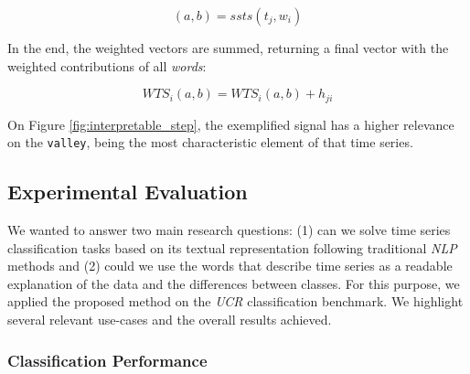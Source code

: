 {\begin{equation}
(a,b) = ssts(t_j, w_i)
\end{equation}

In the end, the  weighted vectors are summed, returning a final vector with the weighted contributions of all \textit{words}:

\begin{equation}
WTS_i(a, b) = WTS_i(a, b) + h_{ji}
\end{equation}

On Figure \ref{fig:interpretable_step}, the exemplified signal has a higher relevance on the \texttt{valley}, being the most characteristic element of that time series.


\subsection{Experimental Evaluation}

We wanted to answer two main research questions: (1) can we solve time series classification tasks based on its textual representation following traditional \textit{NLP} methods and (2) could we use the words that describe time series as a readable explanation of the data and the differences between classes. For this purpose, we applied the proposed method on the \textit{UCR} classification benchmark. We highlight several relevant use-cases and the overall results achieved.

\subsubsection{Classification Performance}

}
